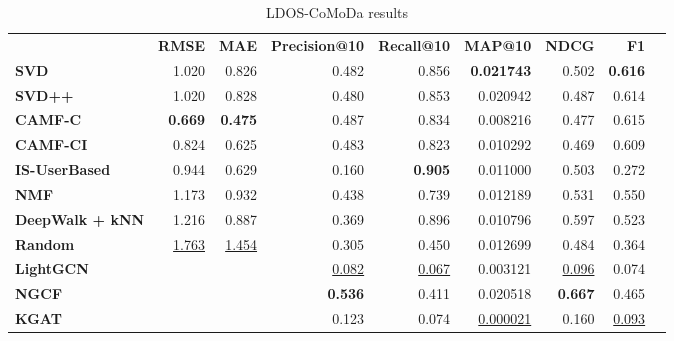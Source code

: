 \begin{table}[!htp]\centering
\caption{LDOS-CoMoDa results}\label{tab:comodatable}
\scriptsize
\begin{tabular}{lrrrrrrrr}\toprule
&\textbf{RMSE} &\textbf{MAE} &\textbf{Precision@10} &\textbf{Recall@10} &\textbf{MAP@10} &\textbf{NDCG} &\textbf{F1} \\\cmidrule{2-8}
\textbf{SVD} &1.020 &0.826 &0.482 &0.856 &\textbf{0.021743} &0.502 &\textbf{0.616} \\\cmidrule{1-8}
\textbf{SVD++} &1.020 &0.828 &0.480 &0.853 &0.020942 &0.487 &0.614 \\\cmidrule{1-8}
\textbf{CAMF-C} &\textbf{0.669} &\textbf{0.475} &0.487 &0.834 &0.008216 &0.477 &0.615 \\\cmidrule{1-8}
\textbf{CAMF-CI} &0.824 &0.625 &0.483 &0.823 &0.010292 &0.469 &0.609 \\\cmidrule{1-8}
\textbf{IS-UserBased} &0.944 &0.629 &0.160 &\textbf{0.905} &0.011000 &0.503 &0.272 \\\cmidrule{1-8}
\textbf{NMF} &1.173 &0.932 &0.438 &0.739 &0.012189 &0.531 &0.550 \\\cmidrule{1-8}
\textbf{DeepWalk + kNN} &1.216 &0.887 &0.369 &0.896 &0.010796 &0.597 &0.523 \\\cmidrule{1-8}
\textbf{Random} &\ul{1.763} &\ul{1.454} &0.305 &0.450 &0.012699 &0.484 &0.364 \\\cmidrule{1-8}
\textbf{LightGCN} & & &\ul{0.082} &\ul{0.067} &0.003121 &\ul{0.096} &0.074 \\\cmidrule{1-1}\cmidrule{1-8}
\textbf{NGCF} & & &\textbf{0.536} &0.411 &0.020518 &\textbf{0.667} &0.465 \\\midrule
\textbf{KGAT} & & &0.123 &0.074 &\ul{0.000021} &0.160 &\ul{0.093} \\
\bottomrule
\end{tabular}
\end{table}

